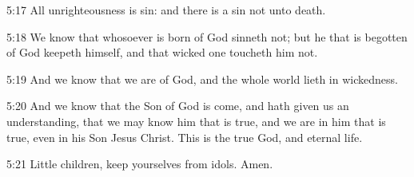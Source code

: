 5:17 All unrighteousness is sin: and there is a sin not unto death.

5:18 We know that whosoever is born of God sinneth not; but he that is begotten of God keepeth himself, and that wicked one toucheth him not.

5:19 And we know that we are of God, and the whole world lieth in wickedness.

5:20 And we know that the Son of God is come, and hath given us an understanding, that we may know him that is true, and we are in him that is true, even in his Son Jesus Christ. This is the true God, and eternal life.

5:21 Little children, keep yourselves from idols. Amen.

